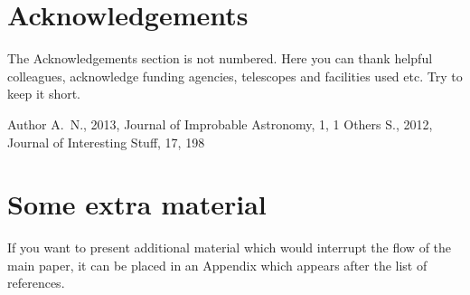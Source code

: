 \documentclass[a4paper,fleqn,usenatbib]{mnras}
\begin{document}
\section*{Acknowledgements}

The Acknowledgements section is not numbered. Here you can thank helpful
colleagues, acknowledge funding agencies, telescopes and facilities used etc.
Try to keep it short.




%


\begin{thebibliography}{99}
Author A.~N., 2013, Journal of Improbable Astronomy, 1, 1
Others S., 2012, Journal of Interesting Stuff, 17, 198
\end{thebibliography}



\appendix

\section{Some extra material}

If you want to present additional material which would interrupt the flow of the main paper,
it can be placed in an Appendix which appears after the list of references.



\bsp	%
\label{lastpage}
\end{document}
